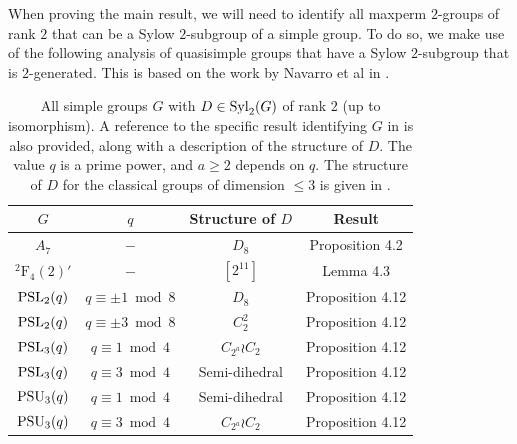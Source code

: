 \documentclass[bysection, amsart]{standard}
\begin{document}
When proving the main result, we will need to identify all maxperm $2$-groups of rank $2$ that can be a Sylow $2$-subgroup of a simple group. To do so, we make use of the following analysis of quasisimple groups that have a Sylow $2$-subgroup that is $2$-generated. This is based on the work by Navarro et al in \cite{paper:rank2-chars}.
\begin{table}[H] 
    \centering
    \begin{tabular}{c|c|c|c}
        $G$ & $q$ & Structure of $D$ & Result \\
        \hline
        $A_7$ & $-$ & $D_8$ & Proposition 4.2 \\
        ${^2 \mathrm{F}_4(2)'}$ & $-$ & $[2^{11}]$ & Lemma 4.3  \\
        $\operatorname{PSL}_2(q)$ & $q \equiv \pm 1 \bmod{8}$ & $D_8$ & Proposition 4.12 \\
        $\operatorname{PSL}_2(q)$ & $q \equiv \pm 3 \bmod{8}$ & $C_2^2$ & Proposition 4.12 \\
        $\operatorname{PSL}_3(q)$ & $q \equiv 1 \bmod{4}$ & $C_{2^a} \wr C_2$ & Proposition 4.12 \\
        $\operatorname{PSL}_3(q)$ & $q \equiv 3 \bmod{4}$ & Semi-dihedral & Proposition 4.12 \\
        $\operatorname{PSU}_3(q)$ & $q \equiv 1 \bmod{4}$ & Semi-dihedral & Proposition 4.12 \\
        $\operatorname{PSU}_3(q)$ & $q \equiv 3 \bmod{4}$ & $C_{2^a} \wr C_2$ & Proposition 4.12 
    \end{tabular}
    \caption{All simple groups $G$ with $D\in \operatorname{Syl}_2(G)$ of rank $2$ (up to isomorphism). A reference to the specific result identifying $G$ in \cite{paper:rank2-chars} is also provided, along with a description of the structure of $D$. The value $q$ is a prime power, and $a \geq 2$ depends on $q$. The structure of $D$ for the classical groups of dimension $\leq 3$ is given in \cite[Chapter 6.5]{book:gls3}.}
    \label{tbl:rank2}
\end{table}
\end{document}
